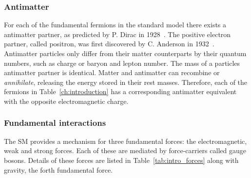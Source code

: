 

\subsubsection{Antimatter}

For each of the fundamental fermions in the standard model there exists a antimatter partner, as predicted by P. Dirac in 1928~\cite{Dirac610}. The positive electron partner, called positron, was first discovered by C. Anderson in 1932~\cite{PhysRev.43.491}.
Antimatter particles only differ from their matter counterparts by their quantum numbers, such as charge or baryon and lepton number. The mass of a particles antimatter partner is identical. Matter and antimatter can recombine or \emph{annihilate}, releasing the energy stored in their rest masses. 
Therefore, each of the fermions in Table~\ref{ch:introduction} has a corresponding antimatter equivalent with the opposite electromagnetic charge.  

\subsubsection{Fundamental interactions}

The SM provides a mechanism for three fundamental forces: the electromagnetic, weak and strong forces. Each of these are mediated by force-carriers called gauge bosons.
Details of these forces are listed in Table~\ref{tab:intro_forces} along with gravity, the forth fundamental force. 

